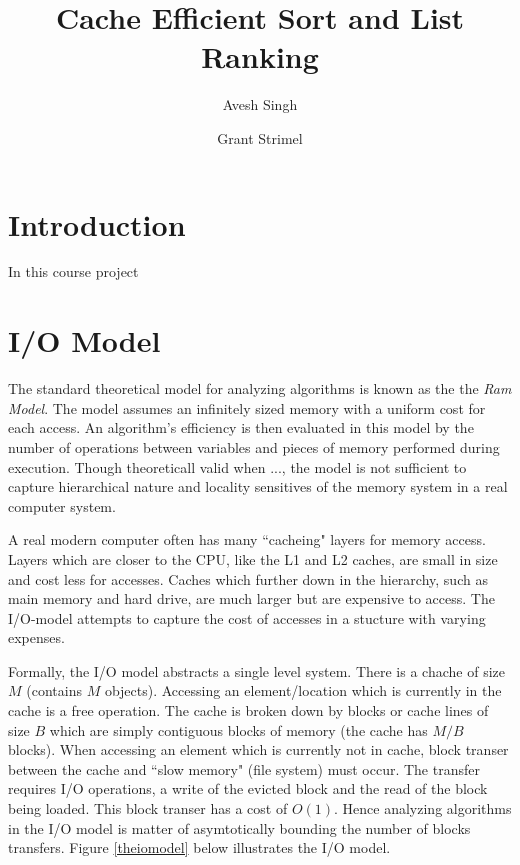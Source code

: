 \documentclass[11pt]{article}
\begin{document}
\title{\Large \bf Cache Efficient Sort and List Ranking}
\author{Avesh Singh \and Grant Strimel}

\maketitle
\section{Introduction}
In this course project


\section{I/O Model}
The standard theoretical model for analyzing algorithms is known as the the \textit{Ram Model}.
The model assumes an infinitely sized memory with a uniform cost for each access.  An algorithm's efficiency is then 
evaluated in this model by the number of operations between variables and pieces of memory performed during execution. 
Though theoreticall valid when ..., the model is not sufficient to capture hierarchical nature and locality sensitives of the memory 
system in a real computer system.

A real modern computer often has many ``cacheing" layers for memory access.  Layers which are closer to the CPU, 
like the L1 and L2 caches, are small in size and cost less for accesses. Caches which further down in the hierarchy, such as 
main memory and hard drive, are much larger but are expensive to access.  The I/O-model attempts to capture the cost of accesses 
in a stucture with varying expenses.

Formally, the I/O model abstracts a single level system.  There is a chache of size $M$ (contains $M$ objects).  
Accessing an element/location which is currently in the cache is a free operation.  The cache is broken down by blocks or 
cache lines of size $B$ which are simply contiguous blocks of memory (the cache has $M/B$ blocks).  
When accessing an element which is currently not in 
cache, block transer between the cache and ``slow memory" (file system)  must occur.  The transfer requires I/O operations, 
a write of the evicted block and the read of the block being loaded.  This block transer has a cost of $O(1)$.  Hence 
analyzing algorithms in the I/O model is matter of asymtotically bounding the number of blocks transfers.  
Figure \ref{theiomodel} below illustrates the I/O model.
\end{document}
